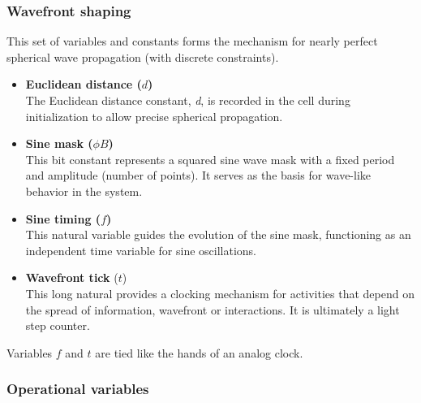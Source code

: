 \documentclass[12pt,english]{article}
\begin{document}
\subsubsection{Wavefront shaping}
This set of variables and constants forms the mechanism for nearly perfect spherical wave propagation (with discrete constraints).
\begin{itemize}
    \item \textbf{Euclidean distance ($d$)} \\
    The Euclidean distance constant, \emph{d}, is recorded in the cell during initialization to allow precise spherical propagation.
    
    \item \textbf{Sine mask ($\phi B$)} \\
    This bit constant represents a squared sine wave mask with a fixed period and amplitude (number of points). It serves as the basis for wave-like behavior in the system.
    
    \item \textbf{Sine timing ($f$)} \\
    This natural variable guides the evolution of the sine mask, functioning as an independent time variable for sine oscillations.

    \item \textbf{Wavefront tick} ($t$)\\
     This long natural provides a clocking mechanism for activities that depend on the spread of information, wavefront or interactions. It is ultimately a light step counter. 
 
\end{itemize}

Variables $f$ and $t$ are tied like the hands of an analog clock.
 
\subsubsection{Operational variables}
\end{document}

